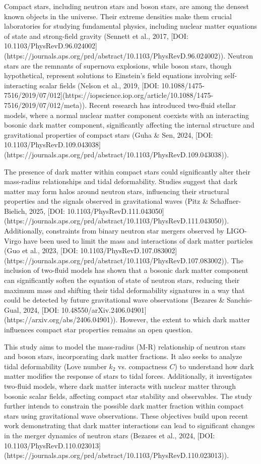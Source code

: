 Compact stars, including neutron stars and boson stars, are among the densest known objects in the universe. Their extreme densities make them crucial laboratories for studying fundamental physics, including nuclear matter equations of state and strong-field gravity (Sennett et al., 2017, [DOI: 10.1103/PhysRevD.96.024002](https://journals.aps.org/prd/abstract/10.1103/PhysRevD.96.024002)). Neutron stars are the remnants of supernova explosions, while boson stars, though hypothetical, represent solutions to Einstein’s field equations involving self-interacting scalar fields (Nelson et al., 2019, [DOI: 10.1088/1475-7516/2019/07/012](https://iopscience.iop.org/article/10.1088/1475-7516/2019/07/012/meta)). Recent research has introduced two-fluid stellar models, where a normal nuclear matter component coexists with an interacting bosonic dark matter component, significantly affecting the internal structure and gravitational properties of compact stars (Guha & Sen, 2024, [DOI: 10.1103/PhysRevD.109.043038](https://journals.aps.org/prd/abstract/10.1103/PhysRevD.109.043038)).  

The presence of dark matter within compact stars could significantly alter their mass-radius relationships and tidal deformability. Studies suggest that dark matter may form halos around neutron stars, influencing their structural properties and the signals observed in gravitational waves (Pitz & Schaffner-Bielich, 2025, [DOI: 10.1103/PhysRevD.111.043050](https://journals.aps.org/prd/abstract/10.1103/PhysRevD.111.043050)). Additionally, constraints from binary neutron star mergers observed by LIGO-Virgo have been used to limit the mass and interactions of dark matter particles (Guo et al., 2023, [DOI: 10.1103/PhysRevD.107.083002](https://journals.aps.org/prd/abstract/10.1103/PhysRevD.107.083002)). The inclusion of two-fluid models has shown that a bosonic dark matter component can significantly soften the equation of state of neutron stars, reducing their maximum mass and shifting their tidal deformability signatures in a way that could be detected by future gravitational wave observations (Bezares & Sanchis-Gual, 2024, [DOI: 10.48550/arXiv.2406.04901](https://arxiv.org/abs/2406.04901)). However, the extent to which dark matter influences compact star properties remains an open question.  

This study aims to model the mass-radius (M-R) relationship of neutron stars and boson stars, incorporating dark matter fractions. It also seeks to analyze tidal deformability (Love number \( k_2 \) vs. compactness \( C \)) to understand how dark matter modifies the response of stars to tidal forces. Additionally, it investigates two-fluid models, where dark matter interacts with nuclear matter through bosonic scalar fields, affecting compact star stability and observables. The study further intends to constrain the possible dark matter fraction within compact stars using gravitational wave observations. These objectives build upon recent work demonstrating that dark matter interactions can lead to significant changes in the merger dynamics of neutron stars (Bezares et al., 2024, [DOI: 10.1103/PhysRevD.110.023013](https://journals.aps.org/prd/abstract/10.1103/PhysRevD.110.023013)).  

